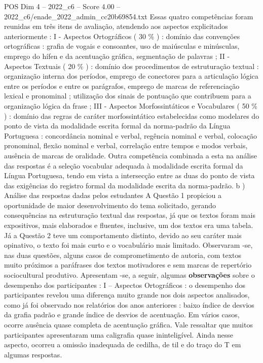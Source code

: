 \begin{textsample}{POS Dim 4 – 2022\_c6 – Score 4.00 – 2022\_c6/enade\_2022\_admin\_cc20b69854.txt}
Essas quatro competências foram reunidas em três itens de avaliação, atendendo aos aspectos explicitados anteriormente : I - Aspectos Ortográficos ( 30 \% ) : domínio das convenções ortográficas : grafia de vogais e consoantes, uso de maiúsculas e minúsculas, emprego do hífen e da acentuação gráfica, segmentação de palavras ; II - Aspectos Textuais ( 20 \% ) : domínio dos procedimentos de estruturação textual : organização interna dos períodos, emprego de conectores para a articulação lógica entre os períodos e entre os parágrafos, emprego de marcas de referenciação lexical e pronominal ; utilização dos sinais de pontuação que contribuem para a organização lógica da frase ; III - Aspectos Morfossintáticos e Vocabulares ( 50 \% ) : domínio das regras de caráter morfossintático estabelecidas como modelares do ponto de vista da modalidade escrita formal da norma-padrão da Língua Portuguesa : concordância nominal e verbal, regência nominal e verbal, colocação pronominal, flexão nominal e verbal, correlação entre tempos e modos verbais, ausência de marcas de oralidade.
Outra competência combinada a esta na análise das respostas é a seleção vocabular adequada à modalidade escrita formal da Língua Portuguesa, tendo em vista a intersecção entre as duas do ponto de vista das exigências do registro formal da modalidade escrita da norma-padrão. b ) Análise das respostas dadas pelos estudantes A Questão 1 propiciou a oportunidade de maior desenvolvimento do tema solicitado, gerando consequências na estruturação textual das respostas, já que os textos foram mais expositivos, mais elaborados e fluentes, inclusive, um dos textos era uma tabela.
Já a Questão 2 teve um comportamento distinto, devido ao seu caráter mais opinativo, o texto foi mais curto e o vocabulário mais limitado.
Observaram -se, nas duas questões, alguns casos de comprometimento de autoria, com textos muito próximos a paráfrases dos textos motivadores e sem marcas de repertório sociocultural produtivo.
Apresentam -se, a seguir, algumas \textbf{observações} sobre o desempenho dos participantes : I – Aspectos Ortográficos : o desempenho dos participantes revelou uma diferença muito grande nos dois aspectos analisados, como já foi observado nos relatórios dos anos anteriores : baixo índice de desvios da grafia padrão e grande índice de desvios de acentuação.
Em vários casos, ocorre ausência quase completa de acentuação gráfica.
Vale ressaltar que muitos participantes apresentaram uma caligrafia quase ininteligível.
Ainda nesse aspecto, ocorreu a omissão inadequada de cedilha, de til e do traço do T em algumas respostas.

\end{textsample}
